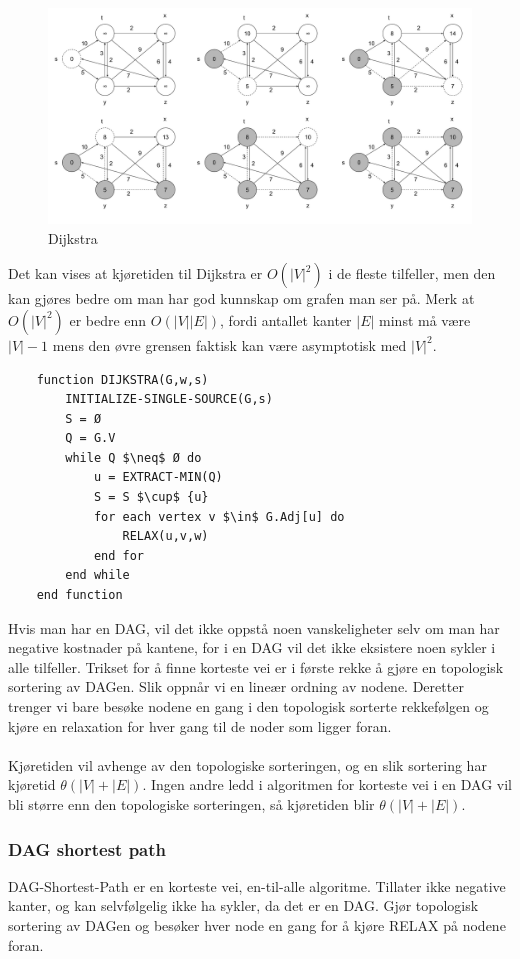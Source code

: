 \begin{figure}[H]
\includegraphics[scale=0.3]{images/dijstra}
\centering %
\caption{Dijkstra}
\label{fig:dijkstra}
\end{figure}

\noindent Det kan vises at kjøretiden til Dijkstra er $O(|V|^2)$ i de fleste tilfeller, men den kan gjøres bedre om man har god kunnskap om grafen man ser på. Merk at $O(|V|^2)$ er bedre enn $O(|V||E|)$, fordi antallet kanter $|E|$ minst må være $|V| - 1$ mens den øvre grensen faktisk kan være asymptotisk med $|V|^2$.

\begin{lstlisting}
    function DIJKSTRA(G,w,s)
	    INITIALIZE-SINGLE-SOURCE(G,s)
    	S = Ø
    	Q = G.V
    	while Q $\neq$ Ø do
    		u = EXTRACT-MIN(Q)
    		S = S $\cup$ {u}
    		for each vertex v $\in$ G.Adj[u] do
    			RELAX(u,v,w)
    		end for
    	end while
    end function
\end{lstlisting}

\noindent Hvis man har en DAG, vil det ikke oppstå noen vanskeligheter selv om man har negative kostnader på kantene, for i en DAG vil det ikke eksistere noen sykler i alle tilfeller. Trikset for å finne korteste vei er i første rekke å gjøre en topologisk sortering av DAGen. Slik oppnår vi en lineær ordning av nodene. Deretter trenger vi bare besøke nodene en gang i den topologisk sorterte rekkefølgen og kjøre en relaxation for hver gang til de noder som ligger foran. 
\\\\
Kjøretiden vil avhenge av den topologiske sorteringen, og en slik sortering har kjøretid $\theta(|V|+|E|)$. Ingen andre ledd i algoritmen for korteste vei i en DAG vil bli større enn den topologiske sorteringen, så kjøretiden blir $\theta(|V|+|E|)$.

\subsubsection{DAG shortest path}
DAG-Shortest-Path er en korteste vei, en-til-alle algoritme. Tillater ikke negative kanter, og kan selvfølgelig ikke ha sykler, da det er en DAG. Gjør topologisk sortering av DAGen og besøker hver node en gang for å kjøre RELAX på nodene foran.

